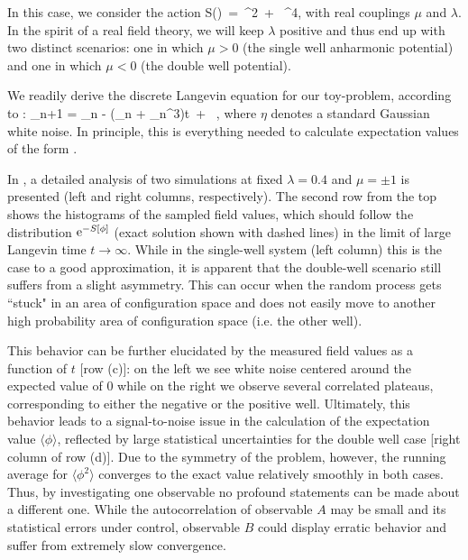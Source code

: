 \documentclass[../main.tex]{subfiles}
\begin{document}
In this case, we consider the action
%
\beq
  S(\phi)\ =\ \phi^2\ + \ \phi^4,
  \label{Eq:langevin_toy_continuum}
\eeq
%
with real couplings $\mu$ and $\lambda$. In the spirit of a real field theory, we will keep $\lambda$ positive and thus end up with two distinct scenarios: one in which $\mu >0$ (the single well anharmonic potential) and one in which $\mu <0$ (the double well potential).

We readily derive the discrete Langevin equation for our toy-problem, according to :
%
\beq
  \phi_{n+1} = \phi_{n} - \left(\mu\phi_{n} + \phi_{n}^3\right)\Delta t\ +\  \;\eta,
  \label{Eq:langevin_toy_discrete}
\eeq
%
where $\eta$ denotes a standard Gaussian white noise. In principle, this is everything needed to calculate expectation values of the form .


In , a detailed analysis of two simulations at fixed $\lambda = 0.4$ and $\mu = \pm 1$ is presented (left and right columns, respectively). The second row from the top shows the histograms of the sampled field values, which should follow the distribution ${\rm e}^{-S[\phi]}$ (exact solution shown with dashed lines) in the limit of large Langevin time $t \rightarrow \infty$. While in the single-well system (left column) this is the case to a good approximation, it is apparent that the double-well scenario still suffers from a slight asymmetry. This can occur when the random process gets ``stuck" in an area of configuration space and does not easily move to another high probability area of configuration space (i.e. the other well).

This behavior can be further elucidated by the measured field values as a function of $t$ [row (c)]: on the left we see white noise centered around the expected value of $0$ while on the right we observe several correlated plateaus, corresponding to either the negative or the positive well. Ultimately, this behavior leads to a signal-to-noise issue in the calculation of the expectation value $\langle \phi \rangle$, reflected by large statistical uncertainties for the double well case [right column of row (d)].  Due to the symmetry of the problem, however, the running average for $\langle \phi^2 \rangle$ converges to the exact value relatively smoothly in both cases. Thus, by investigating one observable no profound statements can be made about a different one. While the autocorrelation of observable $A$ may be small and its statistical errors under control, observable $B$ could display erratic behavior and suffer from extremely slow convergence.
\end{document}
